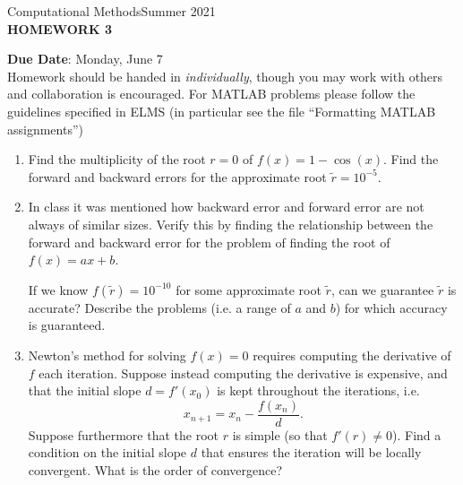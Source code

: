 \documentclass[12pt]{article}
\begin{document}
\begin{center}
Computational Methods\qquad Summer 2021
\\

\textbf{\large HOMEWORK 3}\\
\end{center}
\noindent \textbf{Due Date}: Monday, June 7\\

\noindent Homework should be handed in \emph{individually}, though you may work with others and collaboration is encouraged. For MATLAB problems please follow the guidelines specified in ELMS (in particular see the file ``Formatting MATLAB assignments'')

\begin{enumerate}
\item Find the multiplicity of the root $r=0$ of $f(x)=1-\cos(x)$. Find the forward and backward errors for the approximate root $\widetilde{r}=10^{-5}$.
\item In class it was mentioned how backward error and forward error are not always of similar sizes. Verify this by finding the relationship between the forward and backward error for the problem of finding the root of $f(x)=ax+b$. 

If we know $f(\widetilde{r})=10^{-10}$ for some approximate root $\widetilde{r}$, can we guarantee $\widetilde{r}$ is accurate? Describe the problems (i.e. a range of $a$ and $b$) for which accuracy is guaranteed.
\item Newton's method for solving $f(x)=0$ requires computing the derivative of $f$ each iteration. Suppose instead computing the derivative is expensive, and that the initial slope $d=f'(x_0)$ is kept throughout the iterations, i.e.
	\[x_{n+1}=x_n - \frac{f(x_n)}{d}.\]
Suppose furthermore that the root $r$ is simple (so that $f'(r)\neq 0$). Find a condition on the initial slope $d$ that ensures the iteration will be locally convergent. What is the order of convergence?
\end{enumerate}
\end{document}
